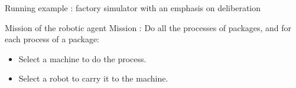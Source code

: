 \begin{frame}{Running example : factory simulator with an emphasis on deliberation}

            
\end{frame}


            

    

\begin{frame}{Mission of the robotic agent}
    \centering
Mission : Do all the processes of packages, and for each process of a package:
\begin{itemize}
    \pause
    \item Select a machine to do the process.
    \pause
    \item Select a robot to carry it to the machine.
\end{itemize}

\end{frame}

